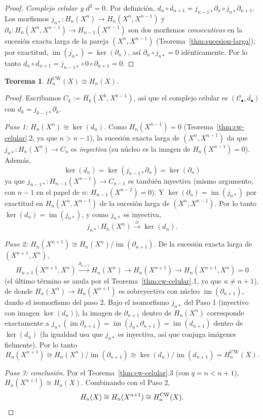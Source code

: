 \documentclass[11pt,a4paper]{article}
\theoremstyle{plain}
\newtheorem{theorem}{Teorema}[section]
\theoremstyle{definition}
\theoremstyle{remark}
\DeclareMathOperator{\im}{im}
\newcommand{\CWq}{\mathrm{CW}}
\begin{document}
\begin{proof}
\emph{Complejo celular y $d^2=0$.} Por definición,
$d_n\circ d_{n+1}=j_{n-1*}\partial_n\circ j_{n*}\partial_{n+1}$. Los
morfismos $j_{n*}:H_n(X^n)\to H_n(X^n,X^{n-1})$ y
$\partial_n:H_n(X^n,X^{n-1})\to H_{n-1}(X^{n-1})$ son dos morfismos
\emph{consecutivos} en la sucesión exacta larga de la pareja
$(X^n,X^{n-1})$ (Teorema~\ref{thm:sucesion-larga}); por exactitud,
$\im(j_{n*})=\ker(\partial_n)$, así $\partial_n\circ j_{n*}=0$
idénticamente. Por lo tanto $d_n\circ d_{n+1}=j_{n-1*}\circ0\circ\partial_{n+1}=0$.
\end{proof}

\begin{theorem}
\label{thm:cw-iso-singular}
$H_n^{\CWq}(X)\cong H_n(X)$.
\end{theorem}

\begin{proof}
Escribamos $C_k:=H_k(X^k,X^{k-1})$, así que el complejo celular es
$(\mathcal C_\bullet,d_\bullet)$ con $d_k=j_{k-1*}\partial_k$.

\emph{Paso 1: $H_n(X^n)\cong\ker(d_n)$.} Como $H_n(X^{n-1})=0$
(Teorema~\ref{thm:cw-celular}.2, ya que $n>n-1$), la sucesión exacta larga
de $(X^n,X^{n-1})$ da que $j_{n*}:H_n(X^n)\to C_n$ es \emph{inyectiva}
(su núcleo es la imagen de $H_n(X^{n-1})=0$). Además,
\[
\ker(d_n)=\ker(j_{n-1*}\partial_n)=\ker(\partial_n)
\]
ya que $j_{n-1*}:H_{n-1}(X^{n-1})\to C_{n-1}$ es también inyectiva (mismo
argumento, con $n-1$ en el papel de $n$: $H_{n-1}(X^{n-2})=0$). Y
$\ker(\partial_n)=\im(j_{n*})$ por exactitud en $H_n(X^n,X^{n-1})$ de la
sucesión larga de $(X^n,X^{n-1})$. Por lo tanto
$\ker(d_n)=\im(j_{n*})$, y como $j_{n*}$ es inyectiva,
\[
j_{n*}:H_n(X^n)\xrightarrow{\cong}\ker(d_n).
\]

\emph{Paso 2: $H_n(X^{n+1})\cong H_n(X^n)/\im(\partial_{n+1})$.} De la
sucesión exacta larga de $(X^{n+1},X^n)$,
\[
H_{n+1}(X^{n+1},X^n)\xrightarrow{\partial_{n+1}}H_n(X^n)\to H_n(X^{n+1})\to H_n(X^{n+1},X^n)=0
\]
(el último término se anula por el Teorema~\ref{thm:cw-celular}.1, ya que
$n\ne n+1$), de donde $H_n(X^n)\to H_n(X^{n+1})$ es sobreyectiva con
núcleo $\im(\partial_{n+1})$, dando el isomorfismo del paso 2. Bajo el
isomorfismo $j_{n*}$ del Paso 1 (inyectivo con imagen $\ker(d_n)$), la
imagen de $\partial_{n+1}$ dentro de $H_n(X^n)$ corresponde exactamente a
$j_{n*}(\im\partial_{n+1})=\im(j_{n*}\partial_{n+1})=\im(d_{n+1})$ dentro
de $\ker(d_n)$ (la igualdad usa que $j_{n*}$ es inyectiva, así que
conjuga imágenes fielmente). Por lo tanto
\[
H_n(X^{n+1})\cong H_n(X^n)/\im(\partial_{n+1})\cong\ker(d_n)/\im(d_{n+1})=H_n^{\CWq}(X).
\]

\emph{Paso 3: conclusión.} Por el Teorema~\ref{thm:cw-celular}.3 (con
$q=n<n+1$), $H_n(X^{n+1})\cong H_n(X)$. Combinando con el Paso 2,
\[
H_n(X)\cong H_n(X^{n+1})\cong H_n^{\CWq}(X).\qedhere
\]
\end{proof}
\end{document}
